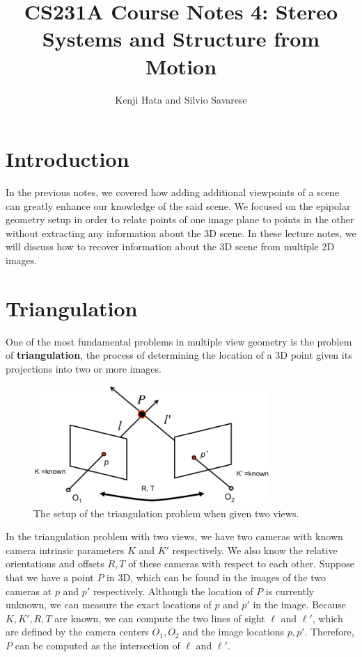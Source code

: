 \documentclass[a4paper, 12pt]{article}
\title{CS231A Course Notes 4: Stereo Systems and Structure from Motion}
\author{Kenji Hata and Silvio Savarese}
\date{}
\renewcommand\emph{\textbf}
\numberwithin{equation}{section}
\begin{document}
\maketitle

\section{Introduction}
In the previous notes, we covered how adding additional viewpoints of a scene can greatly enhance our knowledge of the said scene. We focused on the epipolar geometry setup in order to relate points of one image plane to points in the other without extracting any information about the 3D scene. In these lecture notes, we will discuss how to recover information about the 3D scene from multiple 2D images.

\section{Triangulation}
One of the most fundamental problems in multiple view geometry is the problem of \emph{triangulation}, the process of determining the location of a 3D point given its projections into two or more images. 

\begin{figure}[h!]
\centering
\includegraphics[width=0.8\textwidth]{figures/triangulation.png}
\caption{The setup of the triangulation problem when given two views.}
\label{fig:triangulation}
\end{figure}

In the triangulation problem with two views, we have two cameras with known camera intrinsic parameters $K$ and $K'$ respectively. We also know the relative orientations and offsets $R,T$ of these cameras with respect to each other. Suppose that we have a point $P$ in 3D, which can be found in the images of the two cameras at $p$ and $p'$ respectively. Although the location of $P$ is currently unknown, we can measure the exact locations of $p$ and $p'$ in the image. Because $K, K', R, T$ are known, we can compute the two lines of sight $\ell$ and $\ell'$, which are defined by the camera centers $O_1, O_2$ and the image locations $p, p'$. Therefore, $P$ can be computed as the intersection of $\ell$ and $\ell'$. 
\end{document}
